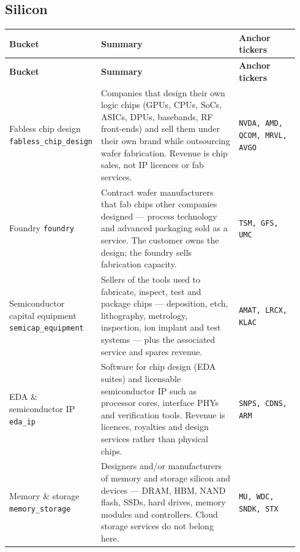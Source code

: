 \documentclass[11pt,a4paper,oneside]{article}
\begin{document}
\subsection*{Silicon}

\begin{longtable}{@{}p{0.20\linewidth} p{0.52\linewidth} p{0.22\linewidth}@{}}
\toprule
\textbf{Bucket} & \textbf{Summary} & \textbf{Anchor tickers} \\
\midrule
\endfirsthead
\toprule
\textbf{Bucket} & \textbf{Summary} & \textbf{Anchor tickers} \\
\midrule
\endhead
\bottomrule
\endfoot
Fabless chip design \newline \texttt{fabless\_chip\_design} & Companies that design their own logic chips (GPUs, CPUs, SoCs, ASICs, DPUs, basebands, RF front-ends) and sell them under their own brand while outsourcing wafer fabrication. Revenue is chip sales, not IP licences or fab services. & \texttt{NVDA, AMD, QCOM, MRVL, AVGO} \\
\addlinespace
Foundry \newline \texttt{foundry} & Contract wafer manufacturers that fab chips other companies designed --- process technology and advanced packaging sold as a service. The customer owns the design; the foundry sells fabrication capacity. & \texttt{TSM, GFS, UMC} \\
\addlinespace
Semiconductor capital equipment \newline \texttt{semicap\_equipment} & Sellers of the tools used to fabricate, inspect, test and package chips --- deposition, etch, lithography, metrology, inspection, ion implant and test systems --- plus the associated service and spares revenue. & \texttt{AMAT, LRCX, KLAC} \\
\addlinespace
EDA \& semiconductor IP \newline \texttt{eda\_ip} & Software for chip design (EDA suites) and licensable semiconductor IP such as processor cores, interface PHYs and verification tools. Revenue is licences, royalties and design services rather than physical chips. & \texttt{SNPS, CDNS, ARM} \\
\addlinespace
Memory \& storage \newline \texttt{memory\_storage} & Designers and/or manufacturers of memory and storage silicon and devices --- DRAM, HBM, NAND flash, SSDs, hard drives, memory modules and controllers. Cloud storage services do not belong here. & \texttt{MU, WDC, SNDK, STX} \\

\end{longtable}
\end{document}
